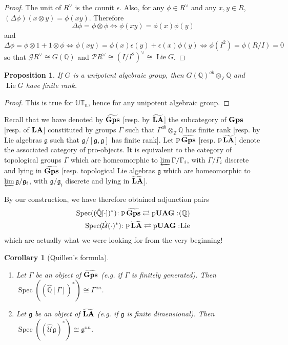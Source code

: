 \documentclass{amsart}
\newtheorem{prop}[thm]{Proposition}
\newtheorem{cor}[thm]{Corollary}
\theoremstyle{definition}
\theoremstyle{remark}
\theoremstyle{remark}
\newcommand{\Q}{\mathbb{Q}}
\newcommand{\Z}{\mathbb{Z}}
\newcommand{\mcG}{\mathcal{G}}
\newcommand{\mcP}{\mathcal{P}}
\newcommand{\mcU}{\mathcal{U}}
\newcommand{\mfg}{\mathfrak{g}}
\newcommand{\adj}[4]{#1\negmedspace: #2\rightleftarrows #3:\negmedspace #4}
\DeclareMathOperator{\Lie}{Lie}
\DeclareMathOperator{\pro}{{p}}
\DeclareMathOperator{\Spec}{Spec}
\DeclareMathOperator{\Gps}{\bf{Gps}}
\DeclareMathOperator{\LA}{\bf{LA}}
\DeclareMathOperator{\pUAG}{p\bf{UAG}}
\begin{document}
\begin{proof}
The unit of $R^\vee$ is the counit $\epsilon$. Also, for any $\phi\in R^\vee$ and any $x,y\in R$, $(\Delta\phi)(x\otimes y)=\phi(xy)$. Therefore
\[
\Delta\phi=\phi\otimes\phi \Leftrightarrow \phi(xy)=\phi(x)\phi(y)
\]
and
\[
\Delta\phi=\phi\otimes1+1\otimes\phi \Leftrightarrow \phi(xy)=\phi(x)\epsilon(y)+\epsilon(x)\phi(y)\Leftrightarrow \phi(I^2)=\phi(R/I)=0
\]
so that $\mcG R^\vee\cong G(\Q)$ and $\mcP R^\vee\cong (I/I^2)^\vee\cong\Lie G$.
\end{proof}

%
\begin{prop}
If $G$ is a unipotent algebraic group, then $G(\Q)^{ab}\otimes_\Z\Q$ and $\Lie G$ have finite rank.
\end{prop}

\begin{proof}
This is true for $\mathbb{UT}_n$, hence for any unipotent algebraic group.
\end{proof}

Recall that we have denoted by $\widetilde{\Gps}$ [resp. by $\widetilde{\LA}$] the subcategory of $\Gps$ [resp. of $\LA$] constituted by groups $\Gamma$ such that $\Gamma^{ab}\otimes_\Z\Q$ has finite rank [resp. by Lie algebras $\mfg$ such that $\mfg/[\mfg,\mfg]$ has finite rank]. Let $\pro\widetilde{\Gps}$ [resp. $\pro\widetilde{\LA}$] denote the associated category of pro-objects. It is equivalent to the category of topological groups $\Gamma$ which are homeomorphic to $\varprojlim \Gamma/\Gamma_i$, with $\Gamma/\Gamma_i$ discrete and lying in $\widetilde{\Gps}$ [resp. topological Lie algebras $\mfg$ which are homeomorphic to $\varprojlim \mfg/\mfg_i$, with $\mfg/\mfg_i$ discrete and lying in $\widetilde{\LA}$]. 

By our construction, we have therefore obtained adjunction pairs
\begin{equation}\label{a}\begin{aligned}
\adj{\Spec((\hat{\Q}[\cdot])^*)}{\pro\widetilde{\Gps}}{\pUAG}{(\Q)}
\\
\adj{\Spec(\hat{\mcU}(\cdot)^*)}{\pro\widetilde{\LA}}{\pUAG}{\Lie}
\end{aligned}
\end{equation}
which are actually what we were looking for from the very beginning!

\begin{cor}[Quillen's formula]
\begin{enumerate}
	\item Let $\Gamma$ be an object of $\widetilde{\Gps}$ (e.g. if $\Gamma$ is finitely generated). Then $\Spec((\hat{\Q}[\Gamma])^*)\cong\Gamma^{un}$. 
	\item Let $\mfg$ be an object of $\widetilde{\LA}$ (e.g. if $\mfg$ is finite dimensional). Then $\Spec((\hat{\mcU}\mfg)^*)\cong\mfg^{un}$. 
\end{enumerate}
\end{cor}
\end{document}
